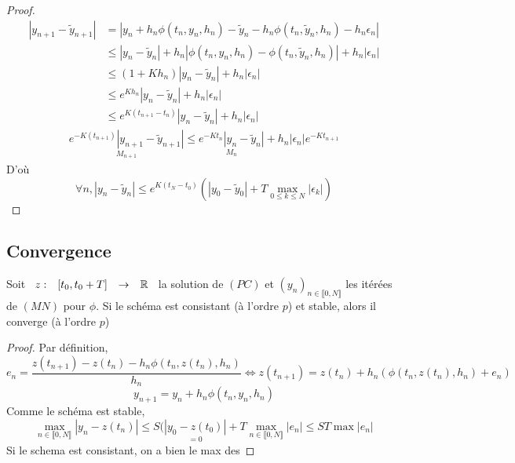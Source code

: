 \documentclass[]{report}
\begin{document}
    \begin{proof}
        \begin{align*}
            \left|y_{n+1}-\tilde{y}_{n+1}\right|&=\left|y_n+h_n\phi(t_n,y_n,h_n)-\tilde{y}_n-h_n\phi(t_n,\tilde{y}_n,h_n)-h_n\epsilon_n\right|\\
            &\le \left|y_n-\tilde{y}_n\right|+h_n\left|\phi(t_n,y_n,h_n)-\phi(t_n,\tilde{y}_n,h_n)\right|+h_n\left|\epsilon_n\right|\\
            &\le (1+K h_n)\left|y_n-\tilde{y}_n\right|+h_n\left|\epsilon_n\right|\\
            &\le e^{Kh_n}\left|y_n-\tilde{y}_n\right|+h_n\left|\epsilon_n\right|\\
            &\le e^{K(t_{n+1}-t_n)}\left|y_n-\tilde{y}_n\right|+h_n\left|\epsilon_n\right|
        \end{align*}
        \begin{align*}
            \underset{M_{n+1}}{e^{-K(t_{n+1})}\left|y_{n+1}-\tilde{y}_{n+1}\right|}\le \underset{M_n}{e^{-Kt_n}\left|y_n-\tilde{y}_n\right|}+h_n \left|\epsilon_n\right|e^{-Kt_{n+1}}
        \end{align*}
        D'où
        \[\forall n, \left|y_n-\tilde{y}_n\right|\le e^{K(t_N-t_0)}(\left|y_0-\tilde{y}_0\right|+T\max_{0\le k\le N}\left|\epsilon_k\right|)\]
    \end{proof}

    \subsection{Convergence}

    \begin{tm}{}{}
        Soit $\begin{array}{ccccc} z : & [t_0,t_0+T] & \to & \mathbb{R} \end{array}$ la solution de $(PC)$ et $(y_n)_{n\in \llbracket 0, N\rrbracket}$ les itérées de $(MN)$ pour $\phi$. Si le schéma est consistant (à l'ordre $p$) et stable, alors il converge (à l'ordre $p$)
    \end{tm}

    \begin{proof}
        Par définition,
        \[e_n=\frac{z(t_{n+1})-z(t_n)-h_n\phi(t_n,z(t_n),h_n)}{h_n}\iff z(t_{n+1})=z(t_n)+h_n(\phi(t_n,z(t_n),h_n)+e_n)\]
        \[y_{n+1}=y_n+h_n\phi(t_n,y_n,h_n)\]
        Comme le schéma est stable,
        \[\max_{n\in \llbracket 0,N\rrbracket }\left| y_n-z(t_n) \right|\le S(\underset{=0}{\left| y_0-z(t_0)\right| }+T\max_{n\in \llbracket 0,N \rrbracket }\left| e_n\right| \le ST \max \left| e_n \right|\]
        Si le schema est consistant, on a bien le max des 
    \end{proof}
\end{document}
